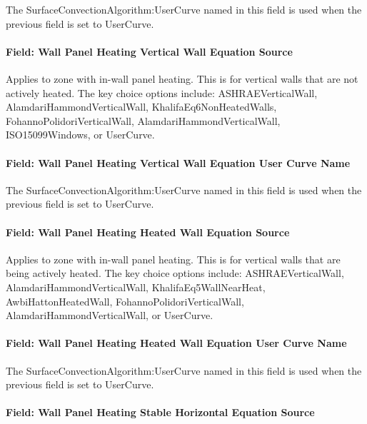 The SurfaceConvectionAlgorithm:UserCurve named in this field is used when the previous field is set to UserCurve.

\paragraph{Field: Wall Panel Heating Vertical Wall Equation Source}\label{field-wall-panel-heating-vertical-wall-equation-source}

Applies to zone with in-wall panel heating. This is for vertical walls that are not actively heated. The key choice options include: ASHRAEVerticalWall, AlamdariHammondVerticalWall, KhalifaEq6NonHeatedWalls, FohannoPolidoriVerticalWall, AlamdariHammondVerticalWall, ISO15099Windows, or UserCurve.

\paragraph{Field: Wall Panel Heating Vertical Wall Equation User Curve Name}\label{field-wall-panel-heating-vertical-wall-equation-user-curve-name}

The SurfaceConvectionAlgorithm:UserCurve named in this field is used when the previous field is set to UserCurve.

\paragraph{Field: Wall Panel Heating Heated Wall Equation Source}\label{field-wall-panel-heating-heated-wall-equation-source}

Applies to zone with in-wall panel heating. This is for vertical walls that are being actively heated. The key choice options include: ASHRAEVerticalWall, AlamdariHammondVerticalWall, KhalifaEq5WallNearHeat, AwbiHattonHeatedWall, FohannoPolidoriVerticalWall, AlamdariHammondVerticalWall, or UserCurve.

\paragraph{Field: Wall Panel Heating Heated Wall Equation User Curve Name}\label{field-wall-panel-heating-heated-wall-equation-user-curve-name}

The SurfaceConvectionAlgorithm:UserCurve named in this field is used when the previous field is set to UserCurve.

\paragraph{Field: Wall Panel Heating Stable Horizontal Equation Source}\label{field-wall-panel-heating-stable-horizontal-equation-source}

